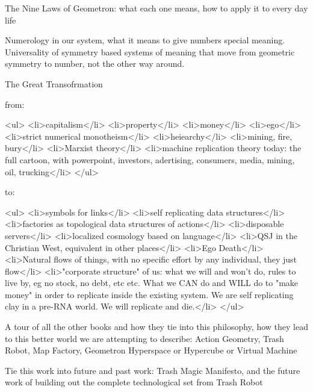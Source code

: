 \documentclass[11pt]{article}
\begin{document}
The Nine Laws of Geometron: what each one means, how to apply it to every day life




Numerology in our system, what it means to give numbers special meaning.  Universality of symmetry based systems of meaning that move from geometric symmetry to number, not the other way around.




The Great Transofrmation




from: 


<ul>
<li>capitalism</li>
<li>property</li>
<li>money</li>
<li>ego</li>
<li>strict numerical monotheism</li>
<li>heiearchy</li>
<li>mining, fire, bury</li>
<li>Marxist theory</li>
<li>machine replication theory today: the full cartoon, with powerpoint, investors, adertising, consumers, media, mining, oil, trucking</li>
</ul>


to:


<ul>
<li>symbols for links</li>
<li>self replicating data structures</li>
<li>factories as topological data structures of actions</li>
<li>disposable servers</li>
<li>localized cosmology based on language</li>
<li>QSJ in the Christian West, equivalent in other places</li>
<li>Ego Death</li>
<li>Natural flows of things, with no specific effort by any individual, they just flow</li>
<li>"corporate structure" of us: what we will and won't do, rules to live by, eg no stock, no debt, etc etc. What we CAN do and WILL do to "make money" in order to replicate inside the existing system.  We are self replicating clay in a pre-RNA world. We will replicate and die.</li>
</ul>


A tour of all the other books and how they tie into this philosophy, how they lead to this better world we are attempting to describe: Action Geometry, Trash Robot, Map Factory, Geometron Hyperspace or Hypercube or Virtual Machine




Tie this work into future and past work: Trash Magic Manifesto, and the future work of building out the complete technological set from Trash Robot
\end{document}
